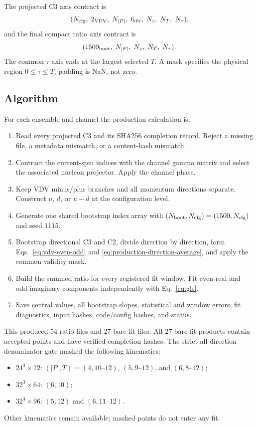 \documentclass[11pt]{article}
\numberwithin{equation}{section}
\begin{document}
The projected C3 axis contract is
\begin{equation}
  (N_{\rm cfg},\;2_{\rm VDV},\;N_{|P|},\;6_{\rm dir},\;
  N_z,\;N_T,\;N_\tau),
  \label{eq:c3-axes}
\end{equation}
and the final compact ratio axis contract is
\begin{equation}
  (1500_{\rm boot},\;N_{|P|},\;N_z,\;N_T,\;N_\tau).
  \label{eq:ratio-axes}
\end{equation}
The common $\tau$ axis ends at the largest selected $T$.  A mask specifies
the physical region $0\leq\tau\leq T$; padding is NaN, not zero.

\subsection{Algorithm}

For each ensemble and channel the production calculation is:
\begin{enumerate}
  \item Read every projected C3 and its SHA256 completion record.  Reject a
        missing file, a metadata mismatch, or a content-hash mismatch.
  \item Contract the current-spin indices with the channel gamma matrix and
        select the associated nucleon projector.  Apply the channel phase.
  \item Keep VDV minus/plus branches and all momentum directions separate.
        Construct $u$, $d$, or $u-d$ at the configuration level.
  \item Generate one shared bootstrap index array with
        $(N_{\rm boot},N_{\rm cfg})=(1500,N_{\rm cfg})$ and seed $1115$.
  \item Bootstrap directional C3 and C2, divide direction by direction, form
        Eqs.~\eqref{eq:vdv-even-odd} and \eqref{eq:production-direction-average},
        and apply the common validity mask.
  \item Build the summed ratio for every registered fit window.  Fit even-real
        and odd-imaginary components independently with Eq.~\eqref{eq:gls}.
  \item Save central values, all bootstrap slopes, statistical and window
        errors, fit diagnostics, input hashes, code/config hashes, and status.
\end{enumerate}

This produced $54$ ratio files and $27$ bare-fit files.  All $27$ bare-fit
products contain accepted points and have verified completion hashes.  The
strict all-direction denominator gate masked the following kinematics:
\begin{itemize}
  \item $24^3\times72$: $(|P|,T)=(4,10\text{--}12)$,
        $(5,9\text{--}12)$, and $(6,8\text{--}12)$;
  \item $32^3\times64$: $(6,10)$;
  \item $32^3\times96$: $(5,12)$ and $(6,11\text{--}12)$.
\end{itemize}
Other kinematics remain available; masked points do not enter any fit.
\end{document}
